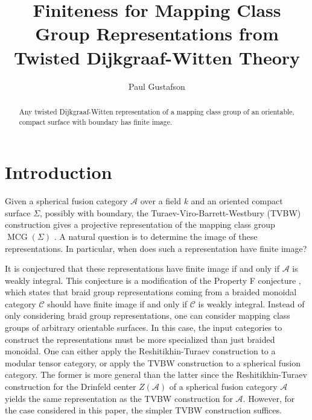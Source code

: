 \documentclass{amsart}
\DeclareMathOperator{\MCG}{MCG}
\newcommand{\Si}{\Sigma}
\begin{document}
\title{Finiteness for Mapping Class Group Representations from Twisted Dijkgraaf-Witten Theory}


\author{Paul Gustafson}
\address{Department of Mathematics,
    Texas A\&M University,
    College Station, TX
    U.S.A.}
    

\begin{abstract}
Any twisted Dijkgraaf-Witten representation of a mapping class group of an orientable, compact surface with boundary has finite image.
\end{abstract}

\maketitle

\section{Introduction}
Given a spherical fusion category $\mathcal A$ over a field $k$ and an oriented compact surface $\Si$, possibly with boundary, the Turaev-Viro-Barrett-Westbury (TVBW) construction gives a projective representation of the mapping class group $\MCG(\Si)$ \cite{TURAEV1992865, hep-th/9311155}.  A natural question is to determine the image of these representations.  In particular,  when does such a representation have finite image?

It is conjectured that these representations have finite image if and only if  $\mathcal A$ is weakly integral.  This conjecture is a modification of the Property F conjecture \cite{nr, erw}, which states that braid group representations coming from a braided monoidal category $\mathcal C$ should have finite image if and only if $\mathcal C$ is weakly integral. Instead of only considering braid group representations, one can consider mapping class groups of arbitrary orientable surfaces.  In this case, the input categories to construct the representations must be more specialized than just braided monoidal.  One can either apply the Reshitikhin-Turaev construction to a modular tensor category, or apply the TVBW construction to a spherical fusion category.  The former is more general than the latter since the Reshitikhin-Turaev construction for the Drinfeld center $Z(\mathcal A)$ of a spherical fusion category $\mathcal A$ yields the same representation as the TVBW construction for $\mathcal A$.  However, for the case considered in this paper, the simpler TVBW construction suffices.
\end{document}
